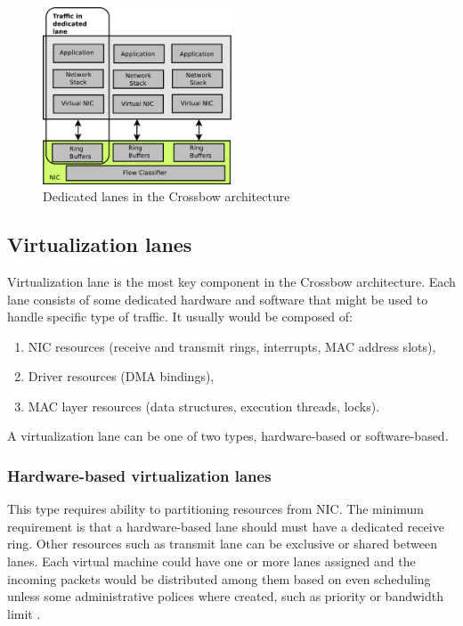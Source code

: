 \documentclass[11pt]{book}
\begin{document}
        \begin{figure}[H]
          \begin{center}
            \includegraphics[width=0.5\textwidth]{img/crossbow-traffic-dedicated-line.pdf}
          \end{center}

          \caption{Dedicated lanes in the Crossbow architecture}
        \end{figure}

		
      \subsection{Virtualization lanes}

        Virtualization lane is the most key component in the Crossbow architecture. Each lane consists of some dedicated
        hardware and software that might be used to handle specific type of traffic. It usually would be composed of: 

        \begin{enumerate}
          \item NIC resources (receive and transmit rings, interrupts, MAC address slots),
          \item Driver resources (DMA bindings),
          \item MAC layer resources (data structures, execution threads, locks).
        \end{enumerate}
        
        A virtualization lane can be one of two types, hardware-based or software-based.

        
        \subsubsection{Hardware-based virtualization lanes}
        
          This type requires ability to partitioning resources from NIC. The minimum requirement is that a
          hardware-based lane should must have a dedicated receive ring.  Other resources such as transmit lane can be
          exclusive or shared between lanes. Each virtual machine could have one or more lanes assigned and the incoming
          packets would be distributed among them based on even scheduling unless some administrative polices where
          created, such as priority or bandwidth limit \cite{crossbow}.		
\end{document}
